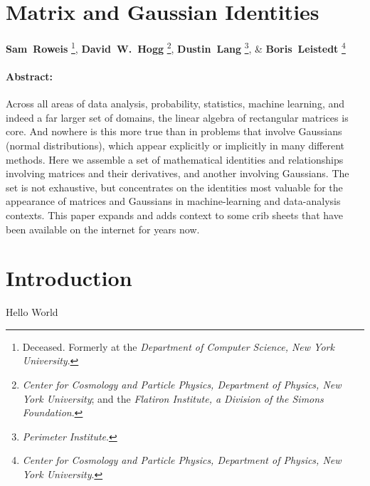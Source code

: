 \documentclass[12pt]{article}
\begin{document}
\section*{Matrix and Gaussian Identities}

{\raggedright
\textbf{Sam~Roweis}%
\footnote{Deceased.
Formerly at the \textsl{Department of Computer Science, New York University}.},
\textbf{David~W.~Hogg}%
\footnote{\textsl{Center for Cosmology and Particle Physics, Department of Physics, New York University}; and the \textsl{Flatiron Institute, a Division of the Simons Foundation}.},
\textbf{Dustin~Lang}%
\footnote{\textsl{Perimeter Institute}.},
\& \textbf{Boris~Leistedt}%
\footnote{\textsl{Center for Cosmology and Particle Physics, Department of Physics, New York University}.}
}

\paragraph{Abstract:}
Across all areas of data analysis, probability, statistics, machine learning, and
indeed a far larger set of domains, the linear algebra of rectangular matrices
is core. And nowhere is this more true than in problems that involve Gaussians (normal
distributions), which appear explicitly or implicitly in many different methods.
Here we assemble a set of mathematical identities and relationships involving
matrices and their derivatives, and another involving Gaussians.
The set is not exhaustive, but concentrates on the identities most valuable
for the appearance of matrices and Gaussians in machine-learning and data-analysis contexts.
This paper expands and adds context to some crib sheets that have been
available on the internet for years now.

\clearpage
\section{Introduction}

Hello World
\end{document}
